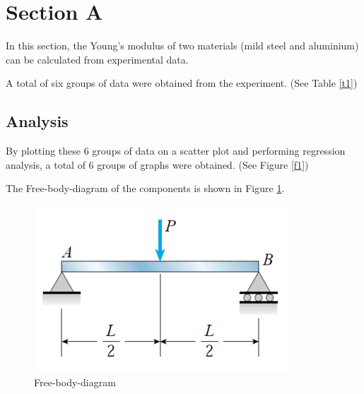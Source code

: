 \section*{Section A}
\label{sec:Section A}
\FloatBarrier %


In this section, the Young's modulus of two materials 
(mild steel and aluminium) can be calculated from experimental data.

A total of six groups of data were obtained from the experiment. (See Table \ref{t1})

\subsection*{Analysis}

By plotting these 6 groups of data on a scatter plot and performing 
regression analysis, a total of 6 groups of graphs were obtained. (See Figure \ref{f1})

The Free-body-diagram of the components is shown in Figure \ref{ff1}.

\begin{figure}
    \centering
    \includegraphics[]{./fig/1.png}
    \caption{Free-body-diagram}
    \label{ff1}
\end{figure}

